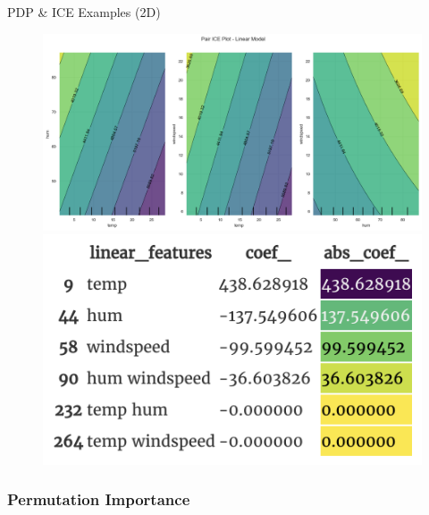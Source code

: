 \documentclass[10pt]{beamer}
\begin{document}
\begin{frame}{PDP \& ICE Examples (2D)}
\begin{center}
  \begin{figure}
    \includegraphics[scale=0.35]{images/interpretable_ml_92_0.png}
    \includegraphics[scale=0.2]{images/interaction_coef.png}
  \end{figure}
\end{center}
\end{frame}


\subsubsection{Permutation Importance}
\end{document}
